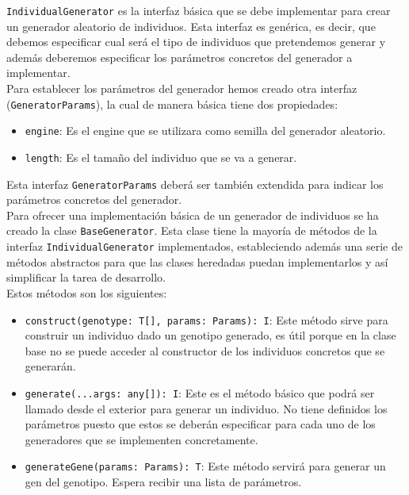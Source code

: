 \texttt{IndividualGenerator} es la interfaz básica que se debe implementar para crear un generador aleatorio de individuos. Esta interfaz es genérica, es decir, que debemos especificar cual será el tipo de individuos que pretendemos generar y además deberemos especificar los parámetros concretos del generador a implementar. \\

Para establecer los parámetros del generador hemos creado otra interfaz (\texttt{GeneratorParams}), la cual de manera básica tiene dos propiedades: 

\begin{itemize}
    \item \texttt{engine}: Es el engine que se utilizara como semilla del generador aleatorio.
    \item \texttt{length}: Es el tamaño del individuo que se va a generar.
\end{itemize}

Esta interfaz \texttt{GeneratorParams} deberá ser también extendida para indicar los parámetros concretos del generador. \\

Para ofrecer una implementación básica de un generador de individuos se ha creado la clase \texttt{BaseGenerator}. Esta clase tiene la mayoría de métodos de la interfaz \texttt{IndividualGenerator} implementados, estableciendo además una serie de métodos abstractos para que las clases heredadas puedan implementarlos y así simplificar la tarea de desarrollo. \\

Estos métodos son los siguientes:

\begin{itemize}
    \item \texttt{construct(genotype: T[], params: Params): I}: Este método sirve para construir un individuo dado un genotipo generado, es útil porque en la clase base no se puede acceder al constructor de los individuos concretos que se generarán.
    \item \texttt{generate(...args: any[]): I}: Este es el método básico que podrá ser llamado desde el exterior para generar un individuo. No tiene definidos los parámetros puesto que estos se deberán especificar para cada uno de los generadores que se implementen concretamente.
    \item \texttt{generateGene(params: Params): T}: Este método servirá para generar un gen del genotipo. Espera recibir una lista de parámetros.
\end{itemize}

